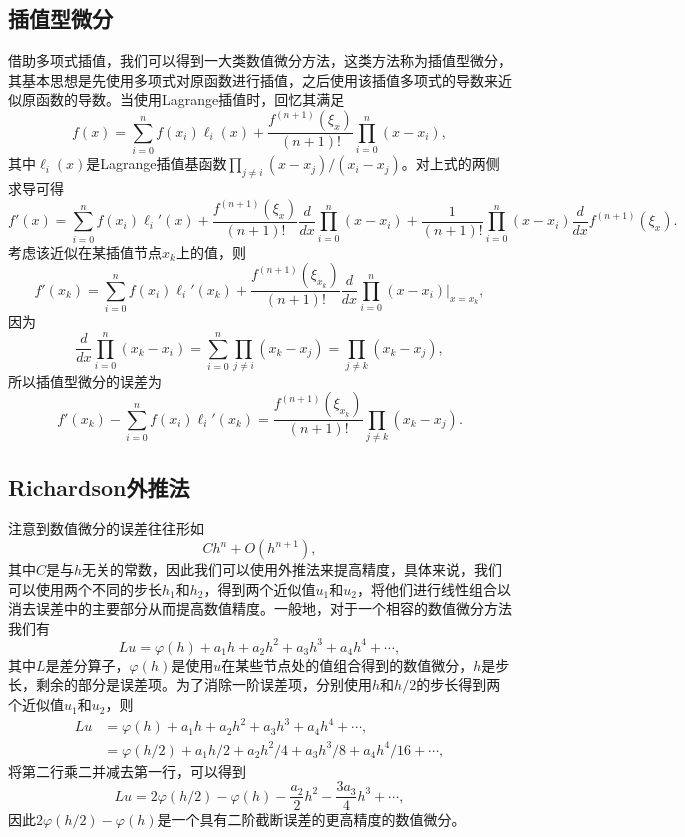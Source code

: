 \documentclass[a4paper,10pt]{ctexart}
\begin{document}
\subsection{插值型微分}
借助多项式插值，我们可以得到一大类数值微分方法，这类方法称为插值型微分，其基本思想是先使用多项式对原函数进行插值，之后使用该插值多项式的导数来近似原函数的导数。当使用Lagrange插值时，回忆其满足
\begin{equation}
    f(x) = \sum_{i=0}^n f(x_i) \ell_i(x) + \frac{f^{(n+1)}(\xi_x)}{(n+1)!} \prod_{i=0}^n (x-x_i),
\end{equation}
其中$ \ell_i(x) $是Lagrange插值基函数$ \prod_{j\ne i} (x-x_j) / (x_i-x_j) $。对上式的两侧求导可得
\begin{equation}
    f'(x) = \sum_{i=0}^n f(x_i) \ell_i'(x) + \frac{f^{(n+1)}(\xi_x)}{(n+1)!} \frac{d}{dx}\prod_{i=0}^n (x-x_i) + \frac{1}{(n+1)!} \prod_{i=0}^n (x-x_i)\frac{d}{dx}f^{(n+1)}(\xi_x).
\end{equation}
考虑该近似在某插值节点$ x_k $上的值，则
\begin{equation}
    f'(x_k) = \sum_{i=0}^n f(x_i) \ell_i'(x_k) + \frac{f^{(n+1)}(\xi_{x_k})}{(n+1)!} \frac{d}{dx}\prod_{i=0}^n (x-x_i)|_{x=x_k},
\end{equation}
因为
\[
    \frac{d}{dx}\prod_{i=0}^n (x_k-x_i) = \sum_{i=0}^n \prod_{j\ne i} (x_k-x_j) = \prod_{j\ne k} (x_k-x_j),
\]
所以插值型微分的误差为
\begin{equation}
    f'(x_k) - \sum_{i=0}^n f(x_i) \ell_i'(x_k) = \frac{f^{(n+1)}(\xi_{x_k})}{(n+1)!} \prod_{j\ne k} (x_k-x_j).
\end{equation}

\subsection{Richardson外推法}
注意到数值微分的误差往往形如
\[
    C h^n + O(h^{n+1}),
\]
其中$ C $是与$ h $无关的常数，因此我们可以使用外推法来提高精度，具体来说，我们可以使用两个不同的步长$ h_1 $和$ h_2 $，得到两个近似值$ u_1 $和$ u_2 $，将他们进行线性组合以消去误差中的主要部分从而提高数值精度。一般地，对于一个相容的数值微分方法我们有
\begin{equation}
    Lu = \varphi(h) + a_1 h + a_2 h^2 + a_3 h^3 + a_4 h^4 + \cdots,
\end{equation}
其中$ L $是差分算子，$ \varphi(h) $是使用$ u $在某些节点处的值组合得到的数值微分，$ h $是步长，剩余的部分是误差项。为了消除一阶误差项，分别使用$ h $和$ h/2 $的步长得到两个近似值$ u_1 $和$ u_2 $，则
\[
    \begin{aligned}
        L u 
        &= \varphi(h) + a_1 h + a_2 h^2 + a_3 h^3 + a_4 h^4 + \cdots,\\
        &= \varphi(h/2) + a_1 h/2 + a_2 h^2/4 + a_3 h^3/8 + a_4 h^4/16 + \cdots,
    \end{aligned}
\]
将第二行乘二并减去第一行，可以得到
\[
    Lu = 2\varphi(h / 2) - \varphi(h) - \frac{a_2}{2}h^2 - \frac{3a_3}{4}h^3 + \cdots,
\]
因此$ 2\varphi(h / 2) - \varphi(h) $是一个具有二阶截断误差的更高精度的数值微分。
\end{document}
